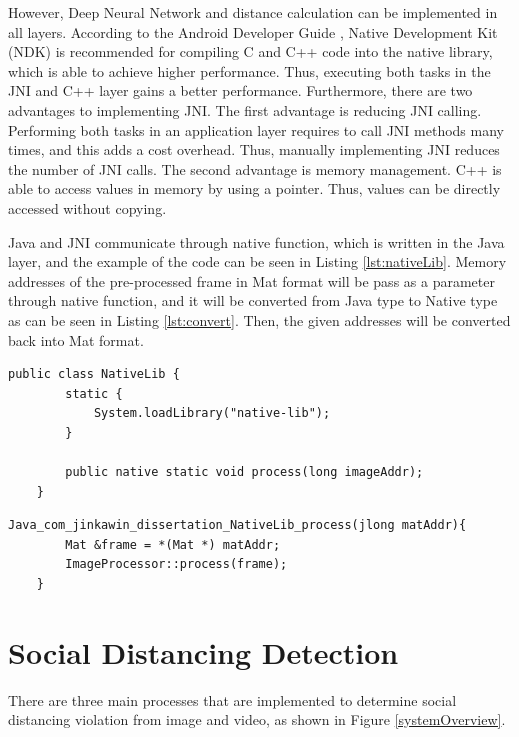         However, Deep Neural Network and distance calculation can be implemented in all layers.
        According to the Android Developer Guide \cite{ANDROID-01},
        Native Development Kit (NDK) is recommended for compiling C and C++ code into the native library,
        which is able to achieve higher performance.
        Thus, executing both tasks in the JNI and C++ layer gains a better performance.
        Furthermore, there are two advantages to implementing JNI.
            The first advantage is reducing JNI calling. Performing both tasks in an application layer requires to call JNI methods many times,
                and this adds a cost overhead.
                Thus, manually implementing JNI reduces the number of JNI calls.
            The second advantage is memory management. C++ is able to access values in memory by using a pointer.
                Thus, values can be directly accessed without copying.

        Java and JNI communicate through native function, which is written in the Java layer,
        and the example of the code can be seen in Listing \ref{lst:nativeLib}.
        Memory addresses of the pre-processed frame in Mat format will be pass as a parameter through native function,
        and it will be converted from Java type to Native type as can be seen in Listing \ref{lst:convert}.
        Then, the given addresses will be converted back into Mat format.

\begin{lstlisting}[caption={Java Native Function},captionpos=b,label={lst:nativeLib}]
    public class NativeLib {
        static {
            System.loadLibrary("native-lib");
        }

        public native static void process(long imageAddr);
    }
\end{lstlisting}

\begin{lstlisting}[caption={C++ JNI Method},captionpos=b,label={lst:convert}]
    Java_com_jinkawin_dissertation_NativeLib_process(jlong matAddr){
        Mat &frame = *(Mat *) matAddr;
        ImageProcessor::process(frame);
    }
\end{lstlisting}

    \section{Social Distancing Detection}
        There are three main processes that are implemented to determine social distancing violation from image and video, as shown in Figure \ref{systemOverview}.

